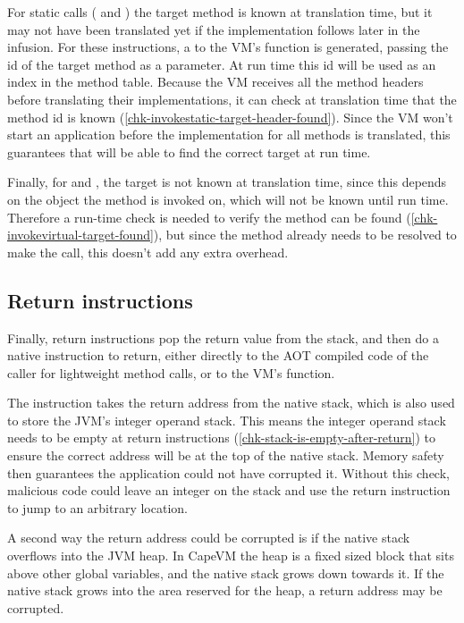 For static calls ( and ) the target method is known at translation time, but it may not have been translated yet if the implementation follows later in the infusion. For these instructions, a  to the VM's  function is generated, passing the id of the target method as a parameter. At run time this id will be used as an index in the method table. Because the VM receives all the method headers before translating their implementations, it can check at translation time that the method id is known (\ref{chk-invokestatic-target-header-found}). Since the VM won't start an application before the implementation for all methods is translated, this guarantees that  will be able to find the correct target at run time.

Finally, for  and , the target is not known at translation time, since this depends on the object the method is invoked on, which will not be known until run time. Therefore a run-time check is needed to verify the method can be found (\ref{chk-invokevirtual-target-found}), but since the method already needs to be resolved to make the call, this doesn't add any extra overhead.

\subsection{Return instructions}
\label{sec-control-flow-safety-return-instructions}
Finally, return instructions pop the return value from the stack, and then do a native  instruction to return, either directly to the AOT compiled code of the caller for lightweight method calls, or to the VM's  function.

The  instruction takes the return address from the native stack, which is also used to store the JVM's integer operand stack. This means the integer operand stack needs to be empty at return instructions (\ref{chk-stack-is-empty-after-return}) to ensure the correct address will be at the top of the native stack. Memory safety then guarantees the application could not have corrupted it. Without this check, malicious code could leave an integer on the stack and use the return instruction to jump to an arbitrary location.

A second way the return address could be corrupted is if the native stack overflows into the JVM heap. In CapeVM the heap is a fixed sized block that sits above other global variables, and the native stack grows down towards it. If the native stack grows into the area reserved for the heap, a return address may be corrupted.


